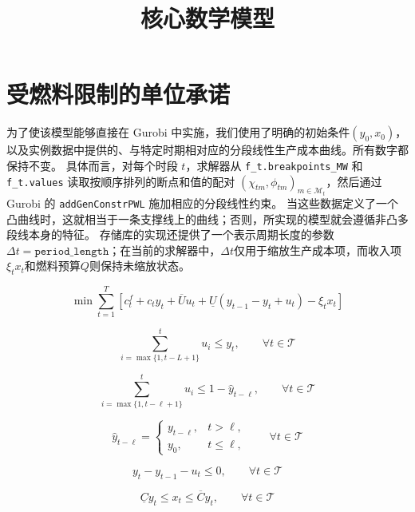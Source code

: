 \documentclass{article}
\title{核心数学模型}
\date{}
\begin{document}
\maketitle

\section*{受燃料限制的单位承诺}

为了使该模型能够直接在 Gurobi 中实施，我们使用了明确的初始条件$(y_0,x_0)$，以及实例数据中提供的、与特定时期相对应的分段线性生产成本曲线。所有数字都保持不变。 具体而言，对每个时段 $t$，求解器从 \texttt{f\_t.breakpoints\_MW} 和 \texttt{f\_t.values} 读取按顺序排列的断点和值的配对 $(\chi_{tm},\phi_{tm})_{m\in\mathcal{M}_t}$，然后通过 Gurobi 的 \texttt{addGenConstrPWL} 施加相应的分段线性约束。 当这些数据定义了一个凸曲线时，这就相当于一条支撑线上的曲线；否则，所实现的模型就会遵循非凸多段线本身的特征。 存储库的实现还提供了一个表示周期长度的参数$\Delta t = \texttt{period\_length}$；在当前的求解器中，$\Delta t$仅用于缩放生产成本项，而收入项$\xi_t x_t$和燃料预算$Q$则保持未缩放状态。

\begin{equation}
\min
\sum_{t=1}^T
\left[
c_t^f + c_t y_t + \overline{U}u_t
+ \underline{U}(y_{t-1} - y_t + u_t)
- \xi_t x_t
\right]
\tag{1a}
\end{equation}

\begin{equation}
\sum_{i=\max\{1,t-L+1\}}^{t} u_i \le y_t,
\qquad \forall t \in \mathcal{T}
\tag{1b}
\end{equation}

\begin{equation}
\sum_{i=\max\{1,t-\ell+1\}}^{t} u_i \le 1-\hat{y}_{t-\ell},
\qquad \forall t \in \mathcal{T}
\tag{1c}
\end{equation}

\begin{equation}
\hat{y}_{t-\ell} =
\begin{cases}
y_{t-\ell}, & t > \ell,\\
y_0, & t \le \ell,
\end{cases}
\qquad \forall t \in \mathcal{T}
\tag{1c'}
\end{equation}

\begin{equation}
y_t - y_{t-1} - u_t \le 0,
\qquad \forall t \in \mathcal{T}
\tag{1d}
\end{equation}

\begin{equation}
\underline{C} y_t \le x_t \le \overline{C} y_t,
\qquad \forall t \in \mathcal{T}
\tag{1e}
\end{equation}
\end{document}
